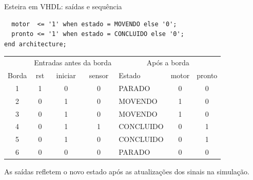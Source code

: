 \begin{frame}[fragile,t]{Esteira em VHDL: saídas e sequência}
\begin{lstlisting}
  motor  <= '1' when estado = MOVENDO else '0';
  pronto <= '1' when estado = CONCLUIDO else '0';
end architecture;
\end{lstlisting}\small
\begin{center}\begin{tabular}{c|ccc|l|cc}
 & \multicolumn{3}{c|}{Entradas antes da borda} & \multicolumn{3}{c}{Após a borda}\\
Borda & rst & iniciar & sensor & Estado & motor & pronto\\\hline
1 & 1 & 0 & 0 & PARADO & 0 & 0\\
2 & 0 & 1 & 0 & MOVENDO & 1 & 0\\
3 & 0 & 1 & 0 & MOVENDO & 1 & 0\\
4 & 0 & 1 & 1 & CONCLUIDO & 0 & 1\\
5 & 0 & 1 & 0 & CONCLUIDO & 0 & 1\\
6 & 0 & 0 & 0 & PARADO & 0 & 0
\end{tabular}\end{center}
As saídas refletem o novo estado após as atualizações dos sinais na simulação.
\end{frame}
